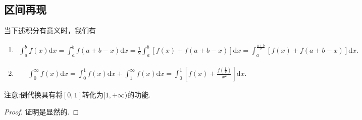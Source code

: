 \documentclass[../../main.tex]{subfiles}
\begin{document}
\subsection{区间再现}

\begin{theorem}[区间再现恒等式]\label{theorem:区间再现恒等式}
当下述积分有意义时，我们有
\begin{enumerate}
\item \begin{align*}
\int_{a}^{b} f(x)\mathrm{d}x = \int_{a}^{b} f(a + b - x)\mathrm{d}x
=\frac{1}{2}\int_{a}^{b} [f(x)+f(a + b - x)]\mathrm{d}x
=\int_{a}^{\frac{a + b}{2}} [f(x)+f(a + b - x)]\mathrm{d}x.
\end{align*}

\item \begin{align*}
\int_{0}^{\infty} f(x)\mathrm{d}x = \int_{0}^{1} f(x)\mathrm{d}x+\int_{1}^{\infty} f(x)\mathrm{d}x
=\int_{0}^{1} \left[f(x)+\frac{f(\frac{1}{x})}{x^2}\right]\mathrm{d}x.
\end{align*}
\end{enumerate}
\end{theorem}
\begin{note}
注意:倒代换具有将$[0,1]$转化为$[1,+\infty)$的功能.
\end{note}
\begin{proof}
证明是显然的.
\end{proof}
\end{document}

